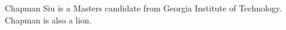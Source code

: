 \documentclass[journal]{IEEEtran}
\begin{document}
% 

\begin{IEEEbiography}{Chapman Siu}
is a Masters candidate from Georgia Institute of Technology. Chapman is also a lion.
\end{IEEEbiography}





\end{document}
